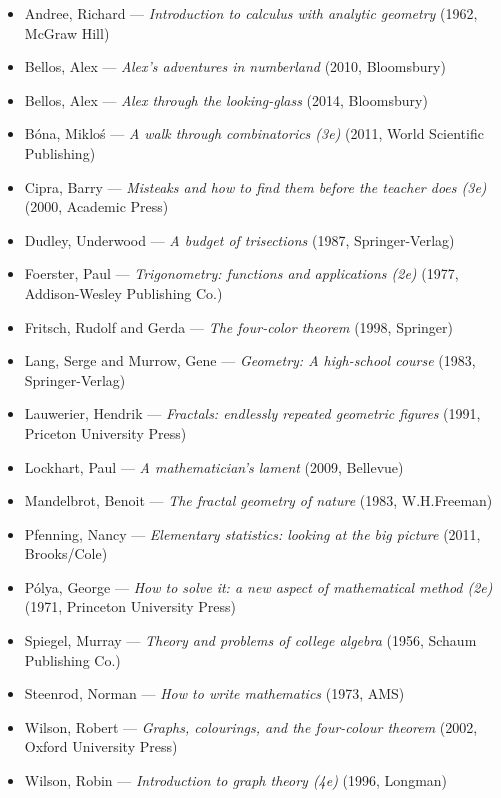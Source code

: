 \begin{itemize}
  \item Andree, Richard --- \emph{Introduction to calculus with analytic geometry} (1962, McGraw Hill)
  \item Bellos, Alex --- \emph{Alex's adventures in numberland} (2010, Bloomsbury)
  \item Bellos, Alex --- \emph{Alex through the looking-glass} (2014, Bloomsbury)
  \item B\'ona, Miklo\'s --- \emph{A walk through combinatorics (3e)} (2011, World Scientific Publishing)
  \item Cipra, Barry --- \emph{Misteaks and how to find them before the teacher does (3e)} (2000, Academic Press)
  \item Dudley, Underwood --- \emph{A budget of trisections} (1987, Springer-Verlag)
  \item Foerster, Paul --- \emph{Trigonometry: functions and applications (2e)} (1977, Addison-Wesley Publishing Co.)
  \item Fritsch, Rudolf and Gerda --- \emph{The four-color theorem} (1998, Springer)
  \item Lang, Serge and Murrow, Gene --- \emph{Geometry: A high-school course} (1983, Springer-Verlag)
  \item Lauwerier, Hendrik --- \emph{Fractals: endlessly repeated geometric figures} (1991, Priceton University Press)
  \item Lockhart, Paul --- \emph{A mathematician's lament} (2009, Bellevue)
  \item Mandelbrot, Benoit --- \emph{The fractal geometry of nature} (1983, W.H.Freeman)
  \item Pfenning, Nancy --- \emph{Elementary statistics: looking at the big picture} (2011, Brooks/Cole)
  \item P\'olya, George --- \emph{How to solve it: a new aspect of mathematical method (2e)} (1971, Princeton University Press)
  \item Spiegel, Murray --- \emph{Theory and problems of college algebra} (1956, Schaum Publishing Co.)
  \item Steenrod, Norman --- \emph{How to write mathematics} (1973, AMS)
  \item Wilson, Robert --- \emph{Graphs, colourings, and the four-colour theorem} (2002, Oxford University Press)
  \item Wilson, Robin --- \emph{Introduction to graph theory (4e)} (1996, Longman)
\end{itemize}


